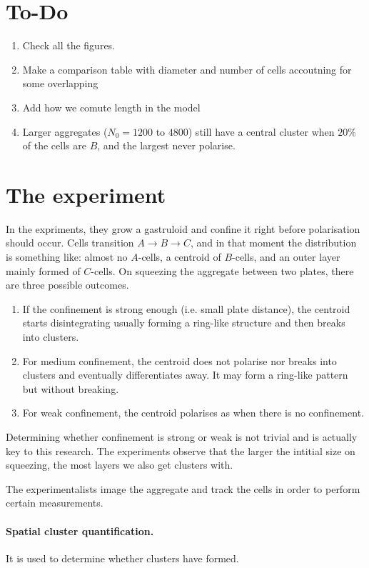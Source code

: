 \documentclass{article}
\begin{document}
\section*{To-Do}
\begin{enumerate}
    \item Check all the figures.
    \item Make a comparison table with diameter and number of cells accoutning for  some overlapping
    \item Add how we comute length in the model
    \item Larger aggregates ($N_0 = 1200$ to $4800$) still have a central cluster when $20\%$ of the cells are $B$, and the largest never polarise.
\end{enumerate}



\section{The experiment}

In the expriments, they grow a gastruloid and confine it right before polarisation should occur. Cells transition $A\to B\to C$, and in that moment the distribution is something like: almost no $A$-cells, a centroid of $B$-cells, and an outer layer mainly formed of $C$-cells. On squeezing the aggregate between two plates, there are three possible outcomes.
\begin{enumerate}
    \item If the confinement is strong enough (i.e. small plate distance), the centroid starts disintegrating usually forming a ring-like structure and then breaks into clusters.
    \item For medium confinement, the centroid does not polarise nor breaks into clusters and eventually differentiates away. It may form a ring-like pattern but without breaking.
    \item For weak confinement, the centroid polarises as when there is no confinement.
\end{enumerate}
Determining whether confinement is strong or weak is not trivial and is actually key to this research. The experiments observe that the larger the intitial size on squeezing, the most layers we also get clusters with.

The experimentalists image the aggregate and track the cells in order to perform certain measurements.

\paragraph{Spatial cluster quantification.} It is used to determine whether clusters have formed.
\end{document}
